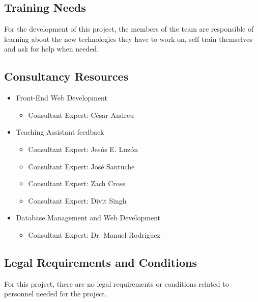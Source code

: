 \subsection{Training Needs}
For the development of this project, the members of the team are responsible of
learning about the new technologies they have to work on, self train themselves
and ask for help when needed.

\subsection{Consultancy Resources}
\begin{itemize}
\item Front-End Web Development
\begin{itemize}
\item Consultant Expert: César Andreu
\end{itemize}
\item Teaching Assistant feedback
\begin{itemize}
\item Consultant Expert: Jesús E. Luzón
\item Consultant Expert: José Santuche
\item Consultant Expert: Zach Cross
\item Consultant Expert: Divit Singh
\end{itemize}
\item Database Management and Web Development
\begin{itemize}
\item Consultant Expert: Dr. Manuel Rodríguez
\end{itemize}
\end{itemize}

\subsection{Legal Requirements and Conditions}

For this project, there are no legal requirements or conditions related to
personnel needed for the project.
